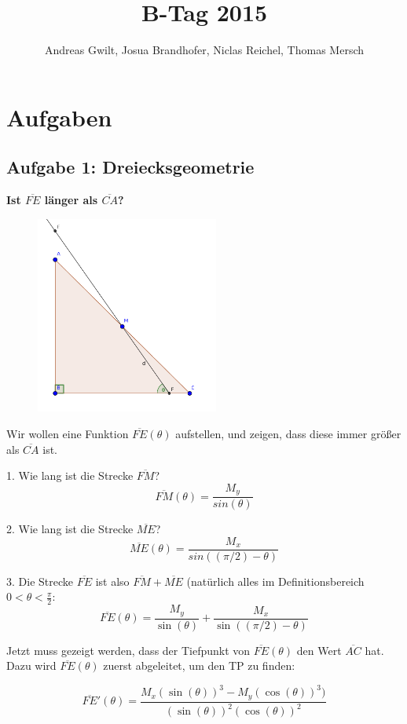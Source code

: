 \documentclass[a4paper,11pt]{article}
\title{B-Tag 2015}
\author{Andreas Gwilt, Josua Brandhofer, Niclas Reichel, Thomas Mersch}
\begin{document}
\maketitle
\tableofcontents

\section{Aufgaben}
\subsection{Aufgabe 1: Dreiecksgeometrie}
\textbf{Ist $\overline{FE}$ länger als $\overline{CA}$?} \\

\begin{figure}[htbp] 
        \centering
        \includegraphics[width=6cm]{img/A1_1.png}
\end{figure}

Wir wollen eine Funktion $\overline{FE}(\theta)$ aufstellen, und zeigen, dass diese immer gr\"o\ss er als $\overline{CA}$ ist.

1. Wie lang ist die Strecke $\overline{FM}$?
\[ \overline{FM}(\theta) = \frac{M_y}{sin(\theta)} \]

2. Wie lang ist die Strecke $\overline{ME}$?
\[ \overline{ME}(\theta) = \frac{M_x}{sin((\pi/2)-\theta)} \]

3. Die Strecke $\overline{FE}$ ist also $\overline{FM} + \overline{ME}$ (natürlich alles im Definitionsbereich $0 < \theta < \frac{\pi}{2}$:
\[ \overline{FE}(\theta) = \frac{M_y}{\sin(\theta)} + \frac{M_x}{\sin((\pi/2)-\theta)} \]

Jetzt muss gezeigt werden, dass der Tiefpunkt von $\overline{FE}(\theta)$ den Wert $\overline{AC}$ hat. Dazu wird $\overline{FE}(\theta)$ zuerst abgeleitet, um den TP zu finden:

\[ \overline{FE}'(\theta) = \frac{M_x (\sin(\theta))^3 - M_y (\cos(\theta))^3)}{(\sin(\theta))^2 (\cos(\theta))^2} \]
\end{document}
